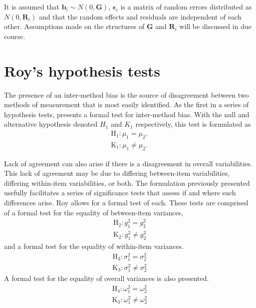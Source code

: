 \documentclass[12pt, a4paper]{report}
\theoremstyle{plain}
\theoremstyle{definition}
\theoremstyle{remark}
\begin{document}
It is assumed that $\boldsymbol{b}_i \sim N(0,\boldsymbol{G})$,
$\boldsymbol{\epsilon}_i$ is a matrix of random errors distributed as $N(0,\boldsymbol{R}_i)$ and
that the random effects and residuals are independent of each other. Assumptions made on the structures of $\boldsymbol{G}$ and $\boldsymbol{R}_i$ will be discussed in due course.

\newpage



\newpage
\section{Roy's hypothesis tests}
The presence of an inter-method bias is the source of disagreement between two methods of measurement that is most easily identified. As the first in a series of hypothesis tests, \citet{roy} presents a formal test for inter-method bias. With the null and alternative hypothesis denoted $H_1$ and $K_1$ respectively, this test is formulated as
\begin{eqnarray*}
	\operatorname{H_1} : \mu_1 = \mu_2 ,\\
	\operatorname{K_1} : \mu_1 \neq \mu_2.
\end{eqnarray*}

Lack of agreement can also arise if there is a disagreement in overall variabilities. This lack of agreement may be due to differing between-item variabilities, differing within-item variabilities, or both. The formulation previously presented usefully facilitates a series of significance tests that assess if and where such differences arise. Roy allows for a formal test of each. These tests are comprised of a formal test for the equality of between-item variances,
\begin{eqnarray*}
	\operatorname{H_2} : g^2_1 = g^2_2 \\
	\operatorname{K_2} : g^2_1 \neq g^2_2
\end{eqnarray*}
and a formal test for the equality of within-item variances.
\begin{eqnarray*}
	\operatorname{H_3} : \sigma^2_1 = \sigma^2_2 \\
	\operatorname{K_3} : \sigma^2_1 \neq \sigma^2_2
\end{eqnarray*}
A formal test for the equality of overall variances is also presented.
\begin{eqnarray*}
	\operatorname{H_4} : \omega^2_1 = \omega^2_2 \\
	\operatorname{K_4} : \omega^2_1 \neq \omega^2_2
\end{eqnarray*}
\end{document}
